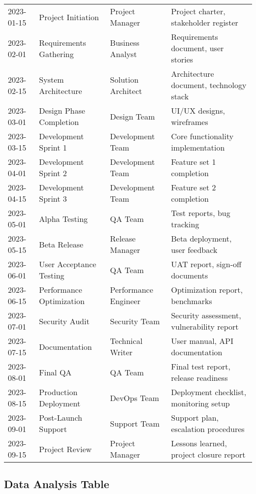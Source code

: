 \documentclass[a4paper,11pt]{article}
\begin{document}
\begin{longtable}{p{2cm}p{4cm}p{3cm}p{4cm}}
2023-01-15 & Project Initiation & Project Manager & Project charter, stakeholder register \\
\rowcolor{rowalt}
2023-02-01 & Requirements Gathering & Business Analyst & Requirements document, user stories \\
2023-02-15 & System Architecture & Solution Architect & Architecture document, technology stack \\
\rowcolor{rowalt}
2023-03-01 & Design Phase Completion & Design Team & UI/UX designs, wireframes \\
2023-03-15 & Development Sprint 1 & Development Team & Core functionality implementation \\
\rowcolor{rowalt}
2023-04-01 & Development Sprint 2 & Development Team & Feature set 1 completion \\
2023-04-15 & Development Sprint 3 & Development Team & Feature set 2 completion \\
\rowcolor{rowalt}
2023-05-01 & Alpha Testing & QA Team & Test reports, bug tracking \\
2023-05-15 & Beta Release & Release Manager & Beta deployment, user feedback \\
\rowcolor{rowalt}
2023-06-01 & User Acceptance Testing & QA Team & UAT report, sign-off documents \\
2023-06-15 & Performance Optimization & Performance Engineer & Optimization report, benchmarks \\
\rowcolor{rowalt}
2023-07-01 & Security Audit & Security Team & Security assessment, vulnerability report \\
2023-07-15 & Documentation & Technical Writer & User manual, API documentation \\
\rowcolor{rowalt}
2023-08-01 & Final QA & QA Team & Final test report, release readiness \\
2023-08-15 & Production Deployment & DevOps Team & Deployment checklist, monitoring setup \\
\rowcolor{rowalt}
2023-09-01 & Post-Launch Support & Support Team & Support plan, escalation procedures \\
2023-09-15 & Project Review & Project Manager & Lessons learned, project closure report \\
\end{longtable}

\subsection{Data Analysis Table}
\end{document}
